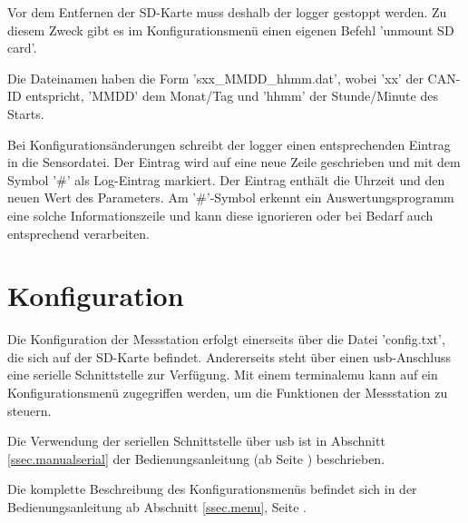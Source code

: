 Vor dem Entfernen der SD-Karte muss deshalb der \gls{logger} gestoppt werden. Zu diesem Zweck gibt es im Konfigurationsmenü einen eigenen Befehl 'unmount SD card'.

Die Dateinamen haben die Form 'sxx\_MMDD\_hhmm.dat', wobei 'xx' der CAN-ID entspricht, 'MMDD' dem Monat/Tag und 'hhmm' der Stunde/Minute des Starts.

Bei Konfigurationsänderungen schreibt der \gls{logger} einen entsprechenden Eintrag in die Sensordatei. Der Eintrag wird auf eine neue Zeile geschrieben und mit dem Symbol '\#' als Log-Eintrag markiert. Der Eintrag enthält die Uhrzeit und den neuen Wert des Parameters. Am '\#'-Symbol erkennt ein Auswertungsprogramm eine solche Informationszeile und kann diese ignorieren oder bei Bedarf auch entsprechend verarbeiten.



\section{Konfiguration}\label{sec.sw_konfiguration}
Die Konfiguration der Messstation erfolgt einerseits über die Datei 'config.txt', die sich auf der SD-Karte befindet. Andererseits steht über einen \gls{usb}-Anschluss eine serielle Schnittstelle zur Verfügung. Mit einem \gls{terminalemu} kann auf ein Konfigurationsmenü zugegriffen werden, um die Funktionen der Messstation zu steuern.

Die Verwendung der seriellen Schnittstelle über \gls{usb} ist in Abschnitt \ref{ssec.manualserial} der Bedienungsanleitung (ab Seite \pageref{ssec.manualserial}) beschrieben.

Die komplette Beschreibung des Konfigurationsmenüs befindet sich in der Bedienungsanleitung ab Abschnitt \ref{ssec.menu}, Seite \pageref{ssec.menu}.
